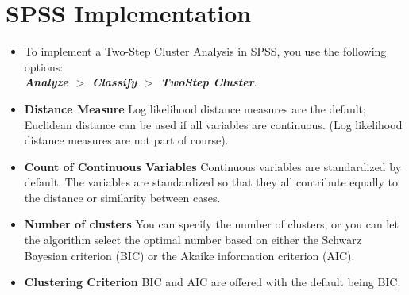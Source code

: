 \documentclass[a4paper,12pt]{article}
\begin{document}
\section{SPSS Implementation}

\begin{itemize}
\item To implement a Two-Step Cluster Analysis in SPSS, you use the following options:\\
\textbf{\textit{Analyze $>$ Classify $>$ TwoStep Cluster}}.

\item \textbf{Distance Measure} Log likelihood distance measures are the default; Euclidean distance can be used if all variables are continuous. (Log likelihood distance measures are not part of course).

\item \textbf{Count of Continuous Variables} Continuous variables are standardized by default. The variables
are standardized so that they all contribute equally to the distance or similarity between cases.

\item \textbf{Number of clusters} You can specify the number of clusters, or you can let the algorithm select
the optimal number based on either the Schwarz Bayesian criterion (BIC) or the Akaike
information criterion (AIC).

\item \textbf{Clustering Criterion} BIC and AIC are offered with the default being BIC.
\end{itemize}
\end{document}
